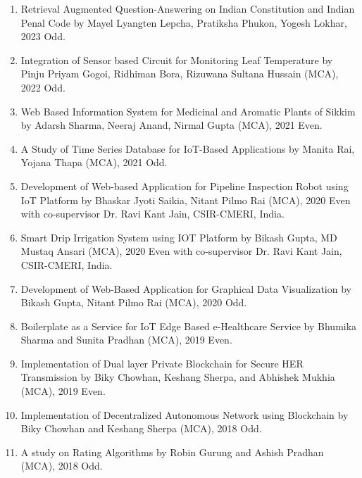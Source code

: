 \documentclass[11pt,a4paper]{moderncv}
\begin{document}
\begin{adjustwidth}{6em}{0pt}
	\begin{enumerate}
		
		\item Retrieval Augmented Question-Answering on Indian Constitution and Indian Penal Code by Mayel Lyangten Lepcha, Pratiksha Phukon, Yogesh Lokhar, 2023 Odd.
		
		\item Integration of Sensor based Circuit for Monitoring Leaf Temperature by Pinju Priyam Gogoi, Ridhiman Bora, Rizuwana Sultana Hussain (MCA), 2022 Odd.
		
		\item Web Based Information System for Medicinal and Aromatic Plants of Sikkim by Adarsh Sharma, Neeraj Anand, Nirmal Gupta (MCA), 2021 Even.
		
		\item A Study of Time Series Database for IoT-Based Applications by Manita Rai, Yojana Thapa (MCA), 2021 Odd.
		
		\item Development of Web-based Application for Pipeline Inspection Robot using IoT Platform by Bhaskar Jyoti Saikia, Nitant Pilmo Rai (MCA), 2020 Even with co-supervisor Dr. Ravi Kant Jain, CSIR-CMERI, India.
		
		\item Smart Drip Irrigation System using IOT Platform by Bikash Gupta, MD Mustaq Ansari (MCA), 2020 Even with co-supervisor Dr. Ravi Kant Jain, CSIR-CMERI, India.
		
		\item Development of Web-Based Application for Graphical Data Visualization by Bikash Gupta, Nitant Pilmo Rai (MCA), 2020 Odd.
		
		\item Boilerplate as a Service for IoT Edge Based e-Healthcare Service by Bhumika Sharma and Sunita Pradhan (MCA), 2019 Even.
		
		\item Implementation of Dual layer Private Blockchain for Secure HER Transmission by Biky Chowhan, Keshang Sherpa, and Abhishek Mukhia (MCA), 2019 Even.
		
		\item Implementation of Decentralized Autonomous Network using Blockchain by Biky Chowhan and Keshang Sherpa (MCA), 2018 Odd.
		
		\item A study on Rating Algorithms by Robin Gurung and Ashish Pradhan (MCA), 2018 Odd.
		

\end{enumerate}
\end{adjustwidth}
\end{document}
